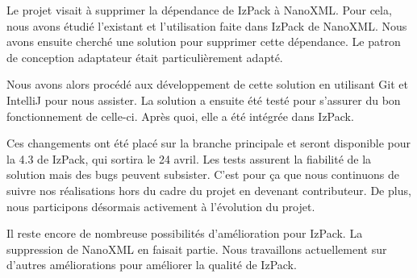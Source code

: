 Le projet visait à supprimer la dépendance de IzPack à NanoXML.
Pour cela, nous avons étudié l'existant et l'utilisation faite dans IzPack de NanoXML.
Nous avons ensuite cherché une solution pour supprimer cette dépendance.
Le patron de conception adaptateur était particulièrement adapté.

Nous avons alors procédé aux développement de cette solution en utilisant Git et IntelliJ pour nous assister.
La solution a ensuite été testé pour s'assurer du bon fonctionnement de celle-ci.
Après quoi, elle a été intégrée dans IzPack.

Ces changements ont été placé sur la branche principale et seront disponible pour la 4.3 de IzPack, qui sortira le 24 avril. Les tests assurent la fiabilité de la solution mais des bugs peuvent subsister.
C'est pour ça que nous continuons de suivre nos réalisations hors du cadre du projet en devenant contributeur.
De plus, nous participons désormais activement à l'évolution du projet.

Il reste encore de nombreuse possibilités d'amélioration pour IzPack.
La suppression de NanoXML en faisait partie.
Nous travaillons actuellement sur d'autres améliorations pour améliorer la qualité de IzPack.

